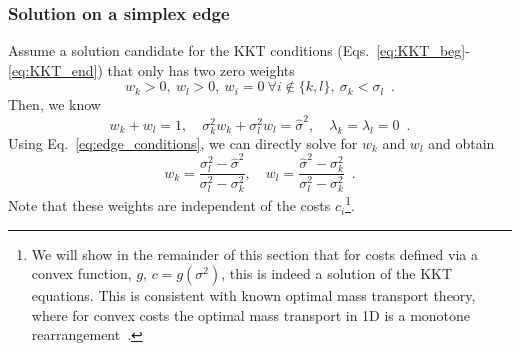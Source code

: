 \documentclass{article}
\numberwithin{equation}{section}
\begin{document}
\subsubsection{Solution on a simplex edge}

Assume a solution candidate for the KKT conditions (Eqs.~\eqref{eq:KKT_beg}-\eqref{eq:KKT_end}) that only has two zero weights
\begin{equation}
  w_k>0,~w_l>0,~w_i=0~\forall i\notin \{k,l\},~\sigma_k<\sigma_l\enspace.
\end{equation}
Then, we know
\begin{equation}
  w_k + w_l =1,\quad \sigma_k^2 w_k + \sigma_l^2 w_l = \hat{\sigma}^2,\quad \lambda_k=\lambda_l=0\enspace.\label{eq:edge_conditions}
\end{equation}
Using Eq.~\eqref{eq:edge_conditions}, we can directly solve for $w_k$ and $w_l$ and obtain
\begin{equation}
  w_k = \frac{\sigma_l^2-\hat{\sigma}^2}{\sigma_l^2-\sigma_k^2},\quad w_l =\frac{\hat{\sigma}^2-\sigma_k^2}{\sigma_l^2-\sigma_k^2}\enspace.
\end{equation}
Note that these weights are independent of the costs $c_i$\footnote{We will show in the remainder of this section that for costs defined via a convex function, $g$, $c=g(\sigma^2)$, this is indeed a solution of the KKT equations. This is consistent with known optimal mass transport theory, where for convex costs the optimal mass transport in 1D is a monotone rearrangement~\cite{delon2012}.}. 
\end{document}
